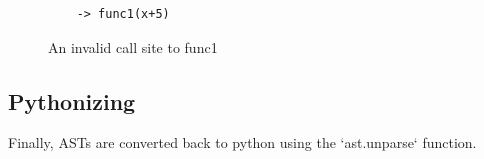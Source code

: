 \begin{figure}
\begin{lstlisting}
    -> func1(x+5) 
\end{lstlisting}
    \caption{An invalid call site to func1}
    \label{fig:invalid-callsite}
\end{figure}


\subsection{Pythonizing}
Finally, ASTs are converted back to python using the `ast.unparse` function.


